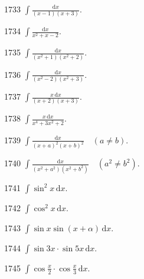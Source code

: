\begin{prob}[S]{1733}
$\displaystyle\int \frac{\mathrm{d}x}{(x - 1)(x + 3)}.$
\end{prob}

\begin{prob}[S]{1734}
$\displaystyle\int \frac{\mathrm{d}x}{x^2 + x - 2}.$
\end{prob}

\begin{prob}[S]{1735}
$\displaystyle\int \frac{\mathrm{d}x}{(x^2 + 1)(x^2 + 2)}.$
\end{prob}

\begin{prob}[S]{1736}
$\displaystyle\int \frac{\mathrm{d}x}{(x^2 - 2)(x^2 + 3)}.$
\end{prob}

\begin{prob}[S]{1737}
$\displaystyle\int \frac{x\,\mathrm{d}x}{(x + 2)(x + 3)}.$
\end{prob}

\begin{prob}[S]{1738}
$\int \frac{x\,\mathrm{d}x}{x^4 + 3x^2 + 2}$.
\end{prob}

\begin{prob}[S]{1739}
$\int \frac{\mathrm{d}x}{(x + a)^2(x + b)^2} \quad (a \neq b)$.
\end{prob}

\begin{prob}[S]{1740}
$\int \frac{\mathrm{d}x}{(x^2 + a^2)(x^2 + b^2)} \quad (a^2 \neq b^2)$.
\end{prob}

\begin{prob}[S]{1741}
$\int \sin^2 x\,\mathrm{d}x$.
\end{prob}

\begin{prob}[S]{1742}
$\int \cos^2 x\,\mathrm{d}x$.
\end{prob}

\begin{prob}[S]{1743}
$\int \sin x \sin(x + \alpha)\,\mathrm{d}x$.
\end{prob}

\begin{prob}[S]{1744}
$\int \sin 3x \cdot \sin 5x\,\mathrm{d}x$.
\end{prob}

\begin{prob}[S]{1745}
$\int \cos\frac{x}{2} \cdot \cos\frac{x}{3}\,\mathrm{d}x$.
\end{prob}

